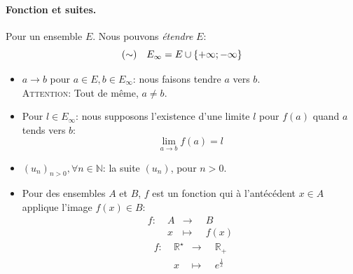 \documentclass[12pt]{article}
\begin{document}
\paragraph{Fonction et suites.}
Pour un ensemble $E$.
Nous pouvons \textit{étendre} $E$: $$
    (\sim) \quad E_{\infty} = E \cup \left\{+\infty; -\infty\right\}
$$

\begin{itemize}
    \item[\Ii] $a \to b$ pour $a \in E, b \in E_{\infty}$: 
        nous faisons tendre $a$ vers $b$. \\
        \textsc{Attention}: Tout de même, $a \neq b$.
    \item Pour $l \in E_{\infty}$: 
        nous supposons l'existence d'une limite $l$ pour $f(a)$ quand $a$ tends vers $b$: 
        $$
            \lim_{a \to b}{f(a)} = l
        $$

    \item $(u_n)_{n > 0}, \forall n \in \mathbb{N}$: la suite $(u_n)$,
        pour $n > 0$.
    \item[\Ii] Pour des ensembles $A$ et $B$, $f$ est un fonction qui à l'antécédent $x \in A$ 
        applique l'image $f(x) \in B$: $$
        \begin{aligned}
            f:\;&A &\to     \;\; &B \\
                &x &\mapsto \;\; &f(x)
        \end{aligned} $$ 
        \Ex $$
        \begin{aligned}
            f:\;&\mathbb{R}^{\star} &\to \;\; &\mathbb{R}_{+} \\
                &x &\mapsto \;\; &e^{\frac{1}{x}}
        \end{aligned} $$ 
\end{itemize}
\end{document}
